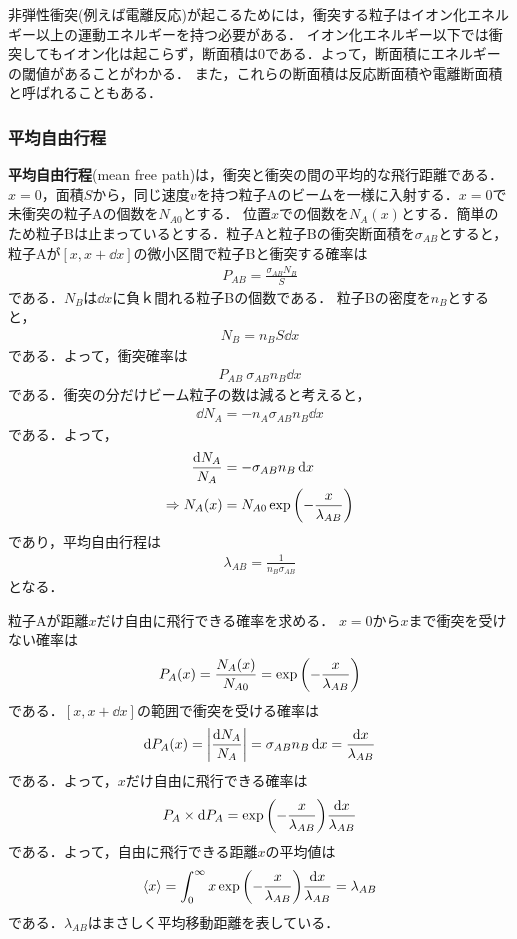 \documentclass{report}
\begin{document}
非弾性衝突(例えば電離反応)が起こるためには，衝突する粒子はイオン化エネルギー以上の運動エネルギーを持つ必要がある．
イオン化エネルギー以下では衝突してもイオン化は起こらず，断面積は0である．よって，断面積にエネルギーの閾値があることがわかる．
また，これらの断面積は反応断面積や電離断面積と呼ばれることもある．

\subsubsection{平均自由行程}
\textbf{平均自由行程}(mean free path)は，衝突と衝突の間の平均的な飛行距離である．
$x=0$，面積$S$から，同じ速度$v$を持つ粒子Aのビームを一様に入射する．$x=0$で未衝突の粒子Aの個数を$N_{A0}$とする．
位置$x$での個数を$N_A(x)$とする．簡単のため粒子Bは止まっているとする．粒子Aと粒子Bの衝突断面積を$\sigma_{AB}$とすると，
粒子Aが$[x,x+\dd{x}]$の微小区間で粒子Bと衝突する確率は
\begin{align}
  P_{AB} = \frac{\sigma_{AB}N_B}{S}
\end{align}
である．$N_B$は$\dd{x}$に負ｋ間れる粒子Bの個数である．
粒子Bの密度を$n_B$とすると，
\begin{align}
  N_B = n_B S \dd{x}
\end{align}
である．よって，衝突確率は
\begin{align}
  P_{AB} ~ \sigma_{AB} n_B \dd{x}
\end{align}
である．衝突の分だけビーム粒子の数は減ると考えると，
\begin{align}
  \dd{N_A} = -n_A \sigma_{AB} n_B \dd{x}
\end{align}
である．よって，
\begin{align}
  \frac{\dd{N_A}}{N_{A}} &= - \sigma_{AB} n_B \dd{x}\\
  \Rightarrow N_A(x) &= N_{A0} \exp\qty(-\frac{x}{\lambda_{AB}})
\end{align}
であり，平均自由行程は
\begin{align}
  \lambda_{AB} = \frac{1}{n_B \sigma_{AB}}
\end{align}
となる．

粒子Aが距離$x$だけ自由に飛行できる確率を求める．
$x=0$から$x$まで衝突を受けない確率は
\begin{align}
  P_A(x) = \frac{N_A(x)}{N_{A0}} = \exp\qty(-\frac{x}{\lambda_{AB}})
\end{align}
である．$[x,x+\dd{x}]$の範囲で衝突を受ける確率は
\begin{align}
  \dd{P_A(x)} = \abs{\frac{\dd{N_A}}{N_A}} = \sigma_{AB} n_B \dd{x} = \frac{\dd{x}}{\lambda_{AB}}
\end{align}
である．よって，$x$だけ自由に飛行できる確率は
\begin{align}
  P_A\times\dd{P_A} = \exp\qty(-\frac{x}{\lambda_{AB}})\frac{\dd{x}}{\lambda_{AB}}
\end{align}
である．よって，自由に飛行できる距離$x$の平均値は
\begin{align}
  \ev{x} = \int_0^{\infty} x\exp\qty(-\frac{x}{\lambda_{AB}})\frac{\dd{x}}{\lambda_{AB}} = \lambda_{AB}
\end{align}
である．$\lambda_{AB}$はまさしく平均移動距離を表している．
\end{document}
